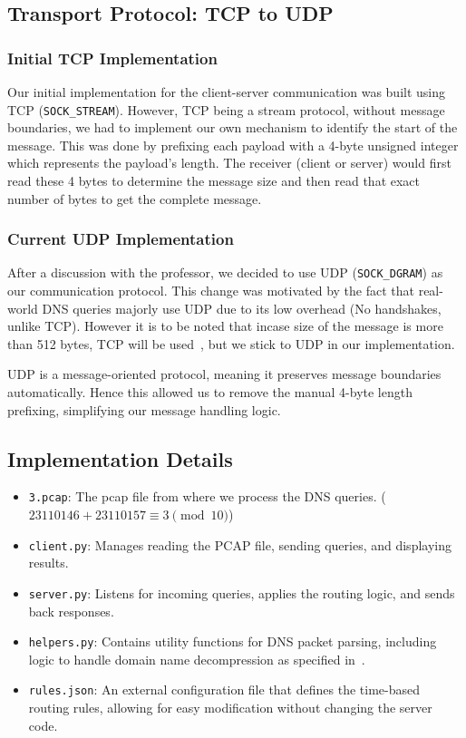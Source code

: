 \documentclass{article}
\begin{document}
\subsection{Transport Protocol: TCP to UDP}

\subsubsection{Initial TCP Implementation}
Our initial implementation for the client-server communication was built using TCP (\texttt{SOCK\_STREAM}). However, TCP being a stream protocol, without message boundaries, we had to implement our own mechanism to identify the start of the message. This was done by prefixing each payload with a 4-byte unsigned integer which represents the payload's length. The receiver (client or server) would first read these 4 bytes to determine the message size and then read that exact number of bytes to get the complete message.

\subsubsection{Current UDP Implementation}
After a discussion with the professor, we decided to use UDP (\texttt{SOCK\_DGRAM}) as our communication protocol. This change was motivated by the fact that real-world DNS queries majorly use UDP due to its low overhead (No handshakes, unlike TCP). However it is to be noted that incase size of the message is more than 512 bytes, TCP will be used~\cite{rfc1035}, but we stick to UDP in our implementation.  

UDP is a message-oriented protocol, meaning it preserves message boundaries automatically. Hence this allowed us to remove the manual 4-byte length prefixing, simplifying our message handling logic. 

\subsection{Implementation Details}
\begin{itemize}
    \item \texttt{3.pcap}: The pcap file from where we process the DNS queries. ($ 23110146 + 23110157 \equiv 3 \pmod{10} $)
    \item \texttt{client.py}: Manages reading the PCAP file, sending queries, and displaying results.
    \item \texttt{server.py}: Listens for incoming queries, applies the routing logic, and sends back responses.
    \item \texttt{helpers.py}: Contains utility functions for DNS packet parsing, including logic to handle domain name decompression as specified in~\cite{rfc1035}.
    \item \texttt{rules.json}: An external configuration file that defines the time-based routing rules, allowing for easy modification without changing the server code.
\end{itemize}
\end{document}
